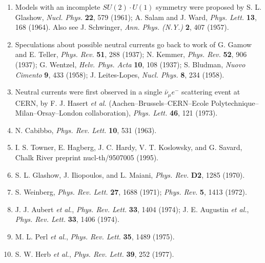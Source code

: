 \begin{enumerate}
\item {}\label{ch21-ref-8}
Models with an incomplete $SU(2)\cdot U(1)$ symmetry were proposed by
S. L. Glashow, \emph{Nucl. Phys.} \textbf{22}, 579 (1961); A. Salam and
J. Ward, \emph{Phys. Lett.} \textbf{13}, 168 (1964). Also see
J. Schwinger, \emph{Ann. Phys. (N.Y.)} \textbf{2}, 407 (1957).

\item {}\label{ch21-ref-9}
Speculations about possible neutral currents go back to work of G. Gamow
and E. Teller, \emph{Phys. Rev.} \textbf{51}, 288 (1937); N. Kemmer,
\emph{Phys. Rev.} \textbf{52}, 906 (1937); G. Wentzel,
\emph{Helv. Phys. Acta} \textbf{10}, 108 (1937); S. Bludman,
\emph{Nuovo Cimento} \textbf{9}, 433 (1958); J. Leites-Lopes,
\emph{Nucl. Phys.} \textbf{8}, 234 (1958).

\item {}\label{ch21-ref-10}
Neutral currents were first observed in a single $\bar\nu_\mu e^-$
scattering event at CERN, by F. J. Hasert \emph{et al.}
(Aachen--Brussels--CERN--Ecole Polytechnique--Milan--Orsay--London
collaboration), \emph{Phys. Lett.} \textbf{46}, 121 (1973).

\item {}\label{ch21-ref-11}
N. Cabibbo, \emph{Phys. Rev. Lett.} \textbf{10}, 531 (1963).

\item {}\label{ch21-ref-12}
I. S. Towner, E. Hagberg, J. C. Hardy, V. T. Koslowsky, and G. Savard,
Chalk River preprint nucl-th/9507005 (1995).

\item {}\label{ch21-ref-13}
S. L. Glashow, J. Iliopoulos, and L. Maiani, \emph{Phys. Rev.}
\textbf{D2}, 1285 (1970).

\item {}\label{ch21-ref-14}
S. Weinberg, \emph{Phys. Rev. Lett.} \textbf{27}, 1688 (1971);
\emph{Phys. Rev.} \textbf{5}, 1413 (1972).

\item {}\label{ch21-ref-15}
J. J. Aubert \emph{et al.}, \emph{Phys. Rev. Lett.} \textbf{33}, 1404
(1974); J. E. Augustin \emph{et al.}, \emph{Phys. Rev. Lett.}
\textbf{33}, 1406 (1974).

\item {}\label{ch21-ref-16}
M. L. Perl \emph{et al.}, \emph{Phys. Rev. Lett.} \textbf{35}, 1489
(1975).

\item {}\label{ch21-ref-17}
S. W. Herb \emph{et al.}, \emph{Phys. Rev. Lett.} \textbf{39}, 252
(1977).


\end{enumerate}
